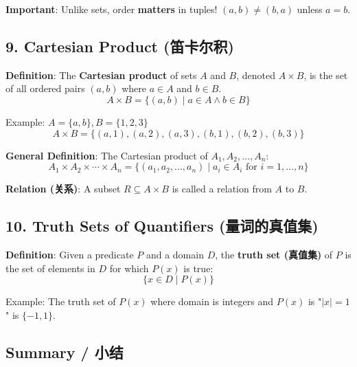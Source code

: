 \documentclass[10pt,a4paper,openany]{ctexbook}
\theoremstyle{definition}
\theoremstyle{remark}
\renewenvironment{quote}
  {\list{}{\leftmargin=1em\rightmargin=0pt\topsep=0.5pt\partopsep=0pt}\item[]}
  {\endlist}
\begin{document}
\begin{quote}
\textbf{Important}: Unlike sets, order \textbf{matters} in tuples! $(a,b) \neq (b,a)$ unless $a = b$.

\end{quote}
\vspace{-2pt}

\subsection{9. Cartesian Product (笛卡尔积)}

\textbf{Definition}: The \textbf{Cartesian product} of sets $A$ and $B$, denoted $A \times B$, is the set of all ordered pairs $(a,b)$ where $a \in A$ and $b \in B$.
\[
A \times B = \{(a,b) \mid a \in A \land b \in B\}
\]

Example: $A = \{a,b\}, B = \{1,2,3\}$
\[
A \times B = \{(a,1), (a,2), (a,3), (b,1), (b,2), (b,3)\}
\]

\textbf{General Definition}: The Cartesian product of $A_1, A_2, \dots, A_n$:
\[
A_1 \times A_2 \times \cdots \times A_n = \{(a_1, a_2, \dots, a_n) \mid a_i \in A_i \text{ for } i = 1, \dots, n\}
\]

\textbf{Relation (关系)}: A subset $R \subseteq A \times B$ is called a relation from $A$ to $B$.
\vspace{-2pt}

\subsection{10. Truth Sets of Quantifiers (量词的真值集)}

\textbf{Definition}: Given a predicate $P$ and a domain $D$, the \textbf{truth set (真值集)} of $P$ is the set of elements in $D$ for which $P(x)$ is true:
\[
\{x \in D \mid P(x)\}
\]

Example: The truth set of $P(x)$ where domain is integers and $P(x)$ is "$|x| = 1$" is $\{-1, 1\}$.
\vspace{-2pt}

\subsection{Summary / 小结}
\end{document}
